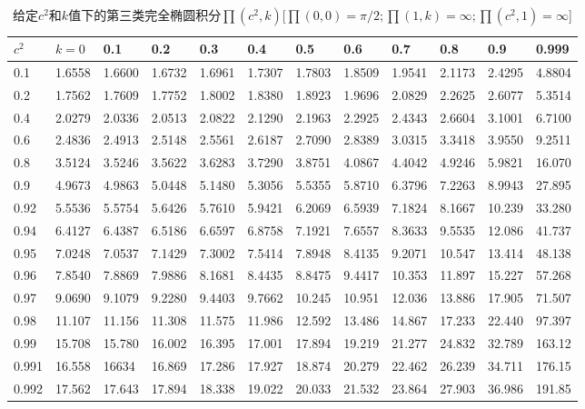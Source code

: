 \begin{table}[htbp]%
	  \centering
	\caption{给定$c^2$和$k$值下的第三类完全椭圆积分$\prod(c^2,k)$[$\prod(0,0)=\pi/2;\prod(1,k)=\infty;\prod(c^2,1)=\infty$]}
	\begin{tabular}{|l||l|l|l|l|l|l|l|l|l|l|l|}
		\hline
		$c^2$ & $k=0$    & 0.1    & 0.2    & 0.3    & 0.4    & 0.5    & 0.6    & 0.7    & 0.8    & 0.9    & 0.999  \\ \hline\hline
		0.1   & 1.6558 & 1.6600 & 1.6732 & 1.6961 & 1.7307 & 1.7803 & 1.8509 & 1.9541 & 2.1173 & 2.4295 & 4.8804 \\ 
		0.2   & 1.7562 & 1.7609 & 1.7752 & 1.8002 & 1.8380 & 1.8923 & 1.9696 & 2.0829 & 2.2625 & 2.6077 & 5.3514 \\ 
		0.4   & 2.0279 & 2.0336 & 2.0513 & 2.0822 & 2.1290 & 2.1963 & 2.2925 & 2.4343 & 2.6604 & 3.1001 & 6.7100 \\ 
		0.6   & 2.4836 & 2.4913 & 2.5148 & 2.5561 & 2.6187 & 2.7090 & 2.8389 & 3.0315 & 3.3418 & 3.9550 & 9.2511 \\ 
		0.8   & 3.5124 & 3.5246 & 3.5622 & 3.6283 & 3.7290 & 3.8751 & 4.0867 & 4.4042 & 4.9246 & 5.9821 & 16.070 \\ 
		0.9   & 4.9673 & 4.9863 & 5.0448 & 5.1480 & 5.3056 & 5.5355 & 5.8710 & 6.3796 & 7.2263 & 8.9943 & 27.895 \\ 
		0.92  & 5.5536 & 5.5754 & 5.6426 & 5.7610 & 5.9421 & 6.2069 & 6.5939 & 7.1824 & 8.1667 & 10.239 & 33.280 \\ 
		0.94  & 6.4127 & 6.4387 & 6.5186 & 6.6597 & 6.8758 & 7.1921 & 7.6557 & 8.3633 & 9.5535 & 12.086 & 41.737 \\ 
		0.95  & 7.0248 & 7.0537 & 7.1429 & 7.3002 & 7.5414 & 7.8948 & 8.4135 & 9.2071 & 10.547 & 13.414 & 48.138 \\ 
		0.96  & 7.8540 & 7.8869 & 7.9886 & 8.1681 & 8.4435 & 8.8475 & 9.4417 & 10.353 & 11.897 & 15.227 & 57.268 \\ 
		0.97  & 9.0690 & 9.1079 & 9.2280 & 9.4403 & 9.7662 & 10.245 & 10.951 & 12.036 & 13.886 & 17.905 & 71.507 \\ 
		0.98  & 11.107 & 11.156 & 11.308 & 11.575 & 11.986 & 12.592 & 13.486 & 14.867 & 17.233 & 22.440 & 97.397 \\ 
		0.99  & 15.708 & 15.780 & 16.002 & 16.395 & 17.001 & 17.894 & 19.219 & 21.277 & 24.832 & 32.789 & 163.12 \\ 
		0.991 & 16.558 & 16634  & 16.869 & 17.286 & 17.927 & 18.874 & 20.279 & 22.462 & 26.239 & 34.711 & 176.15 \\ 
		0.992 & 17.562 & 17.643 & 17.894 & 18.338 & 19.022 & 20.033 & 21.532 & 23.864 & 27.903 & 36.986 & 191.85 \\

\end{tabular}
\end{table}
